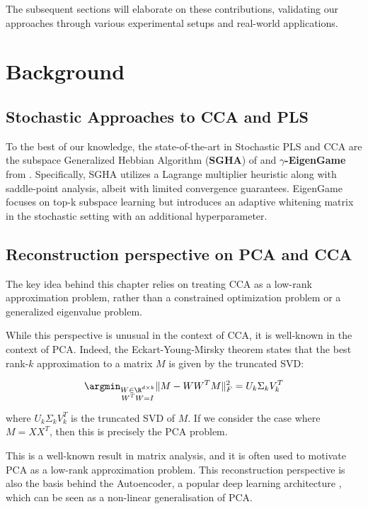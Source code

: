 The subsequent sections will elaborate on these contributions, validating our approaches through various experimental setups and real-world applications.


\section{Background}
\subsection{Stochastic Approaches to CCA and PLS}

To the best of our knowledge, the state-of-the-art in Stochastic PLS and CCA are the subspace Generalized Hebbian Algorithm (\textbf{SGHA}) of \citep{chen2019constrained} and \textbf{$\gamma$-EigenGame} from \citep{gemp20,gemp2021}. Specifically, SGHA utilizes a Lagrange multiplier heuristic along with saddle-point analysis, albeit with limited convergence guarantees. EigenGame focuses on top-k subspace learning but introduces an adaptive whitening matrix in the stochastic setting with an additional hyperparameter.

\subsection{Reconstruction perspective on PCA and CCA}
The key idea behind this chapter relies on treating CCA as a low-rank approximation problem, rather than a constrained optimization problem or a generalized eigenvalue problem.

While this perspective is unusual in the context of CCA, it is well-known in the context of PCA. Indeed, the Eckart-Young-Mirsky theorem \citep{stewart_matrix_1990} states that the best rank-$k$ approximation to a matrix $M$ is given by the truncated SVD:

\begin{align}
    \argmin_{\substack{W \in \R^{d \times k} \\ W^T W = I}} \| M - W W^T M \|_F^2 = U_k \Sigma_k V_k^T
\end{align}

where $U_k \Sigma_k V_k^T$ is the truncated SVD of $M$. If we consider the case where $M=XX^T$, then this is precisely the PCA problem. 

This is a well-known result in matrix analysis, and it is often used to motivate PCA as a low-rank approximation problem. 
This reconstruction perspective is also the basis behind the Autoencoder, a popular deep learning architecture \citep{goodfellow2016deep}, which can be seen as a non-linear generalisation of PCA. 

